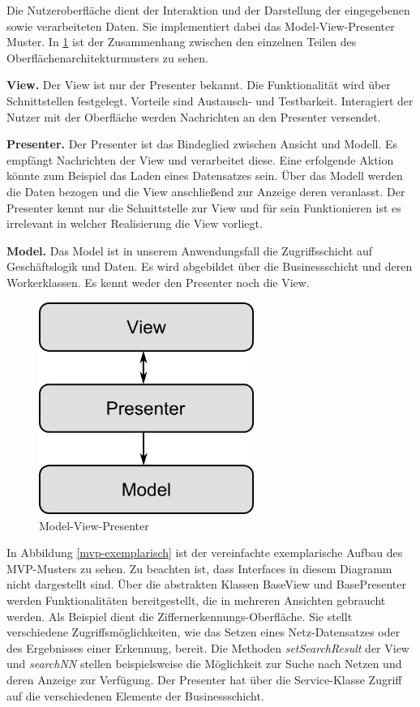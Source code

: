 Die Nutzeroberfläche dient der Interaktion und der Darstellung der eingegebenen sowie verarbeiteten Daten. Sie implementiert dabei das Model-View-Presenter Muster. In \ref{mvp} ist der Zusammenhang zwischen den einzelnen Teilen des Oberflächenarchitekturmusters zu sehen.

\textbf{View.} Der View ist nur der Presenter bekannt. Die Funktionalität wird über Schnittstellen festgelegt. Vorteile sind Austausch- und Testbarkeit. Interagiert der Nutzer mit der Oberfläche werden Nachrichten an den Presenter versendet.

\textbf{Presenter.} Der Presenter ist das Bindeglied zwischen Ansicht und Modell. Es empfängt Nachrichten der View und verarbeitet diese. Eine erfolgende Aktion könnte zum Beispiel das Laden eines Datensatzes sein. Über das Modell werden die Daten bezogen und die View anschließend zur Anzeige deren veranlasst. Der Presenter kennt nur die Schnittstelle zur View und für sein Funktionieren ist es irrelevant in welcher Realisierung die View vorliegt.

\textbf{Model.} Das Model ist in unserem Anwendungsfall die Zugriffsschicht auf Geschäftslogik und Daten. Es wird abgebildet über die Businessschicht und deren Workerklassen. Es kennt weder den Presenter noch die View.

\begin{figure}[H]
	\begin{center}
		\includegraphics[width=7cm]{Abbildungen/UML/daniel/MVP.png}
		\caption{Model-View-Presenter} 
		\label{mvp}
	\end{center}
\end{figure}

In Abbildung \ref{mvp-exemplarisch} ist der vereinfachte exemplarische Aufbau des MVP-Musters zu sehen. Zu beachten ist, dass Interfaces in diesem Diagramm nicht dargestellt sind. Über die abstrakten Klassen BaseView und BasePresenter werden Funktionalitäten bereitgestellt, die in mehreren Ansichten gebraucht werden. Als Beispiel dient die Ziffernerkennungs-Oberfläche. Sie stellt verschiedene Zugriffsmöglichkeiten, wie das Setzen eines Netz-Datensatzes oder des Ergebnisses einer Erkennung, bereit. Die Methoden \textit{setSearchResult} der View und \textit{searchNN} stellen beispielsweise die Möglichkeit zur Suche nach Netzen und deren Anzeige zur Verfügung. Der Presenter hat über die Service-Klasse Zugriff auf die verschiedenen Elemente der Businessschicht. 

